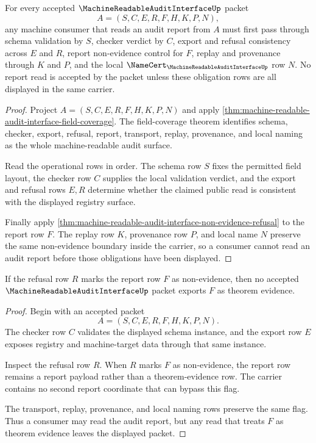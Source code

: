 \begin{theorem}
\label{thm:machine-readable-audit-interface-obligation-basis}
For every accepted $\MachineReadableAuditInterfaceUp$ packet
$$
A=(S,C,E,R,F,H,K,P,N),
$$
any machine consumer that reads an audit report from $A$ must first pass through schema validation by $S$, checker verdict by $C$, export and refusal consistency across $E$ and $R$, report non-evidence control for $F$, replay and provenance through $K$ and $P$, and the local $\NameCert_{\MachineReadableAuditInterfaceUp}$ row $N$. No report read is accepted by the packet unless these obligation rows are all displayed in the same carrier.
\end{theorem}
\begin{proof}
Project $A=(S,C,E,R,F,H,K,P,N)$ and apply \autoref{thm:machine-readable-audit-interface-field-coverage}. The field-coverage theorem identifies schema, checker, export, refusal, report, transport, replay, provenance, and local naming as the whole machine-readable audit surface.

Read the operational rows in order. The schema row $S$ fixes the permitted field layout, the checker row $C$ supplies the local validation verdict, and the export and refusal rows $E,R$ determine whether the claimed public read is consistent with the displayed registry surface.

Finally apply \autoref{thm:machine-readable-audit-interface-non-evidence-refusal} to the report row $F$. The replay row $K$, provenance row $P$, and local name $N$ preserve the same non-evidence boundary inside the carrier, so a consumer cannot read an audit report before those obligations have been displayed.
\end{proof}

\begin{theorem}
\label{thm:machine-readable-audit-interface-non-evidence-refusal}
If the refusal row $R$ marks the report row $F$ as non-evidence, then no accepted $\MachineReadableAuditInterfaceUp$ packet exports $F$ as theorem evidence.
\end{theorem}
\begin{proof}
Begin with an accepted packet
$$
A=(S,C,E,R,F,H,K,P,N).
$$
The checker row $C$ validates the displayed schema instance, and the export row $E$ exposes registry and machine-target data through that same instance.

Inspect the refusal row $R$. When $R$ marks $F$ as non-evidence, the report row remains a report payload rather than a theorem-evidence row. The carrier contains no second report coordinate that can bypass this flag.

The transport, replay, provenance, and local naming rows preserve the same flag. Thus a consumer may read the audit report, but any read that treats $F$ as theorem evidence leaves the displayed packet.
\end{proof}

